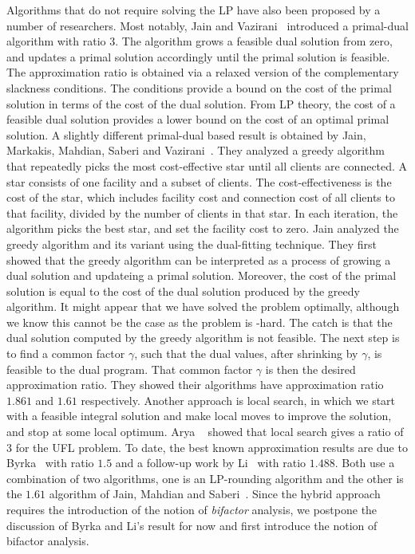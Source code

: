 \documentclass[oneside,final]{ucr}
\begin{document}
Algorithms that do not require solving the LP have also been
proposed by a number of researchers. Most notably, Jain and
Vazirani~\cite{JainV01} introduced a primal-dual algorithm
with ratio $3$. The algorithm grows a feasible dual solution
from zero, and updates a primal solution accordingly until
the primal solution is feasible. The approximation ratio is
obtained via a relaxed version of the complementary
slackness conditions. The conditions provide a bound on the
cost of the primal solution in terms of the cost of the dual
solution. From LP theory, the cost of a feasible dual
solution provides a lower bound on the cost of an optimal
primal solution. A slightly different primal-dual based
result is obtained by Jain, Markakis, Mahdian, Saberi and
Vazirani~\cite{JainMMSV03}. They analyzed a greedy algorithm
that repeatedly picks the most cost-effective star until all
clients are connected. A star consists of one facility and a
subset of clients. The cost-effectiveness is the cost of the
star, which includes facility cost and connection cost of
all clients to that facility, divided by the number of
clients in that star. In each iteration, the algorithm picks
the best star, and set the facility cost to zero. Jain
{\etal} analyzed the greedy algorithm and its variant using
the dual-fitting technique. They first showed that the
greedy algorithm can be interpreted as a process of growing
a dual solution and updateing a primal solution. Moreover,
the cost of the primal solution is equal to the cost of the
dual solution produced by the greedy algorithm. It might
appear that we have solved the {\UFL} problem optimally,
although we know this cannot be the case as the {\UFL}
problem is {\NP}-hard. The catch is that the dual solution
computed by the greedy algorithm is not feasible. The next
step is to find a common factor $\gamma$, such that the dual
values, after shrinking by $\gamma$, is feasible to the dual
program. That common factor $\gamma$ is then the desired
approximation ratio. They showed their algorithms have
approximation ratio $1.861$ and $1.61$ respectively. Another
approach is local search, in which we start with a feasible
integral solution and make local moves to improve the
solution, and stop at some local optimum. Arya
{\etal}~\cite{AryaGKMMP01} showed that local search gives a
ratio of $3$ for the UFL problem. To date, the best known
approximation results are due to Byrka~\cite{Byrka07} with
ratio $1.5$ and a follow-up work by Li~\cite{Li11} with
ratio $1.488$. Both use a combination of two algorithms, one
is an LP-rounding algorithm and the other is the $1.61$
algorithm of Jain, Mahdian and Saberi~\cite{JainMS02}. Since
the hybrid approach requires the introduction of the notion
of \emph{bifactor} analysis, we postpone the discussion of
Byrka and Li's result for now and first introduce the notion
of bifactor analysis.
\end{document}
